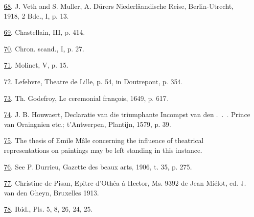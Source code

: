 \protect\hypertarget{23_NOTES.xhtmlux5cux23id_177}{\protect\hyperlink{21_Chapter_Thirteen__IMAGE_AND_WORD.xhtmlux5cux23id_176}{68}}.
J. Veth and S. Muller, A. Dürers Niederläandische Reise, Berlin-Utrecht,
1918, 2 Bde., I, p. 13.

\protect\hypertarget{23_NOTES.xhtmlux5cux23id_175}{\protect\hyperlink{21_Chapter_Thirteen__IMAGE_AND_WORD.xhtmlux5cux23id_174}{69}}.
Chastellain, III, p. 414.

\protect\hypertarget{23_NOTES.xhtmlux5cux23id_173}{\protect\hyperlink{21_Chapter_Thirteen__IMAGE_AND_WORD.xhtmlux5cux23id_172}{70}}.
Chron. scand., I, p. 27.

\protect\hypertarget{23_NOTES.xhtmlux5cux23id_171}{\protect\hyperlink{21_Chapter_Thirteen__IMAGE_AND_WORD.xhtmlux5cux23id_170}{71}}.
Molinet, V, p. 15.

\protect\hypertarget{23_NOTES.xhtmlux5cux23id_169}{\protect\hyperlink{21_Chapter_Thirteen__IMAGE_AND_WORD.xhtmlux5cux23id_168}{72}}.
Lefebvre, Theatre de Lille, p. 54, in Doutrepont, p. 354.

\protect\hypertarget{23_NOTES.xhtmlux5cux23id_167}{\protect\hyperlink{21_Chapter_Thirteen__IMAGE_AND_WORD.xhtmlux5cux23id_166}{73}}.
Th. Godefroy, Le ceremonial françois, 1649, p. 617.

\protect\hypertarget{23_NOTES.xhtmlux5cux23id_165}{\protect\hyperlink{21_Chapter_Thirteen__IMAGE_AND_WORD.xhtmlux5cux23id_164}{74}}.
J. B. Houwaert, Declaratie van die triumphante Incompst van den .~.~.
Prince van Oraingnien etc.; t'Antwerpen, Plantijn, 1579, p. 39.

\protect\hypertarget{23_NOTES.xhtmlux5cux23id_163}{\protect\hyperlink{21_Chapter_Thirteen__IMAGE_AND_WORD.xhtmlux5cux23id_162}{75}}.
The thesis of Emile Mâle concerning the influence of theatrical
representations on paintings may be left standing in this instance.

\protect\hypertarget{23_NOTES.xhtmlux5cux23id_161}{\protect\hyperlink{21_Chapter_Thirteen__IMAGE_AND_WORD.xhtmlux5cux23id_160}{76}}.
See P. Durrieu, Gazette des beaux arts, 1906, t. 35, p. 275.

\protect\hypertarget{23_NOTES.xhtmlux5cux23id_159}{\protect\hyperlink{21_Chapter_Thirteen__IMAGE_AND_WORD.xhtmlux5cux23id_158}{77}}.
Christine de Pisan, Epitre d'Othéa à Hector, Ms. 9392 de Jean Miélot,
ed. J. van den Gheyn, Bruxelles 1913.

\protect\hypertarget{23_NOTES.xhtmlux5cux23id_157}{\protect\hyperlink{21_Chapter_Thirteen__IMAGE_AND_WORD.xhtmlux5cux23id_156}{78}}.
Ibid., Pls. 5, 8, 26, 24, 25.

